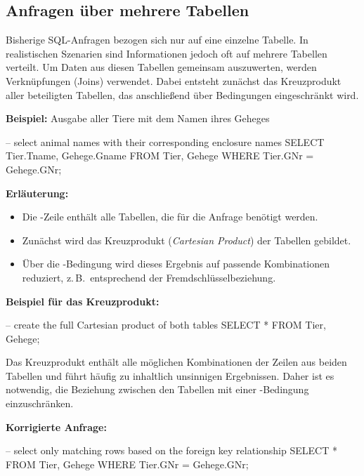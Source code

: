 \subsection{Anfragen über mehrere Tabellen}

    Bisherige SQL-Anfragen bezogen sich nur auf eine einzelne Tabelle.  
    In realistischen Szenarien sind Informationen jedoch oft auf mehrere Tabellen verteilt.  
    Um Daten aus diesen Tabellen gemeinsam auszuwerten, werden Verknüpfungen (Joins) verwendet.  
    Dabei entsteht zunächst das Kreuzprodukt aller beteiligten Tabellen, das anschließend über Bedingungen
    eingeschränkt wird.

    \textbf{Beispiel:} Ausgabe aller Tiere mit dem Namen ihres Geheges
    \begin{sql}
    -- select animal names with their corresponding enclosure names
    SELECT Tier.Tname, Gehege.Gname
        FROM Tier, Gehege
        WHERE Tier.GNr = Gehege.GNr;
    \end{sql}

    \textbf{Erläuterung:}
    \begin{itemize}
        \item Die -Zeile enthält alle Tabellen, die für die Anfrage benötigt werden.
        \item Zunächst wird das Kreuzprodukt (\textit{Cartesian Product}) der Tabellen gebildet.
        \item Über die -Bedingung wird dieses Ergebnis auf passende Kombinationen reduziert,
            z.\,B.\ entsprechend der Fremdschlüsselbeziehung.
    \end{itemize}

    \textbf{Beispiel für das Kreuzprodukt:}
    \begin{sql}
    -- create the full Cartesian product of both tables
    SELECT *
        FROM Tier, Gehege;
    \end{sql}

    \begin{tcolorbox}[gray={Hinweis zum Kreuzprodukt}]
    Das Kreuzprodukt enthält alle möglichen Kombinationen der Zeilen aus beiden Tabellen
    und führt häufig zu inhaltlich unsinnigen Ergebnissen.  
    Daher ist es notwendig, die Beziehung zwischen den Tabellen mit einer -Bedingung
    einzuschränken.
    \end{tcolorbox}

    \textbf{Korrigierte Anfrage:}
    \begin{sql}
    -- select only matching rows based on the foreign key relationship
    SELECT *
        FROM Tier, Gehege
        WHERE Tier.GNr = Gehege.GNr;
    \end{sql}


